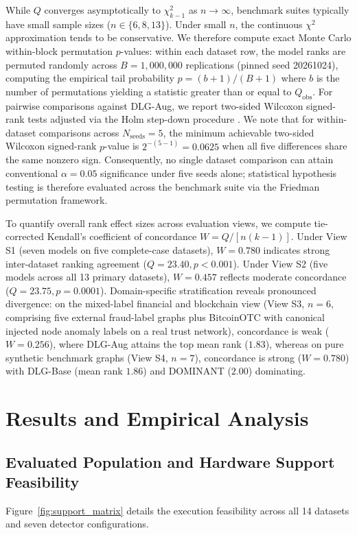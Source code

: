 \documentclass[11pt,a4paper]{article}
\begin{document}
While $Q$ converges asymptotically to $\chi^2_{k-1}$ as $n \to \infty$, benchmark suites typically have small sample sizes ($n \in \{6, 8, 13\}$). Under small $n$, the continuous $\chi^2$ approximation tends to be conservative. We therefore compute exact Monte Carlo within-block permutation $p$-values: within each dataset row, the model ranks are permuted randomly across $B=1,000,000$ replications (pinned seed 20261024), computing the empirical tail probability $p = (b + 1) / (B + 1)$ where $b$ is the number of permutations yielding a statistic greater than or equal to $Q_{\mathrm{obs}}$. For pairwise comparisons against DLG-Aug, we report two-sided Wilcoxon signed-rank tests adjusted via the Holm step-down procedure \cite{holm1979}. We note that for within-dataset comparisons across $N_{\mathrm{seeds}} = 5$, the minimum achievable two-sided Wilcoxon signed-rank $p$-value is $2^{-(5-1)} = 0.0625$ when all five differences share the same nonzero sign. Consequently, no single dataset comparison can attain conventional $\alpha = 0.05$ significance under five seeds alone; statistical hypothesis testing is therefore evaluated across the benchmark suite via the Friedman permutation framework.

To quantify overall rank effect sizes across evaluation views, we compute tie-corrected Kendall's coefficient of concordance $W = Q / [n (k - 1)]$. Under View S1 (seven models on five complete-case datasets), $W=0.780$ indicates strong inter-dataset ranking agreement ($Q=23.40, p < 0.001$). Under View S2 (five models across all 13 primary datasets), $W=0.457$ reflects moderate concordance ($Q=23.75, p = 0.0001$). Domain-specific stratification reveals pronounced divergence: on the mixed-label financial and blockchain view (View S3, $n=6$, comprising five external fraud-label graphs plus BitcoinOTC with canonical injected node anomaly labels on a real trust network), concordance is weak ($W=0.256$), where DLG-Aug attains the top mean rank ($1.83$), whereas on pure synthetic benchmark graphs (View S4, $n=7$), concordance is strong ($W=0.780$) with DLG-Base (mean rank $1.86$) and DOMINANT ($2.00$) dominating.

\section{Results and Empirical Analysis}
\label{sec:results}

\subsection{Evaluated Population and Hardware Support Feasibility}
Figure~\ref{fig:support_matrix} details the execution feasibility across all 14 datasets and seven detector configurations.
\end{document}

